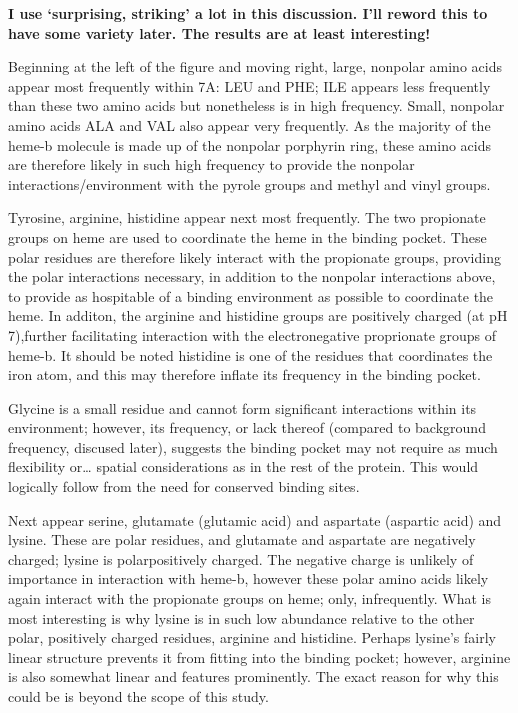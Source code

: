 \documentclass[a4paper, nobind]{templates/ociamthesis}
\begin{document}
\textbf{I use `surprising, striking' a lot in this discussion. I'll reword this to have some variety later. The results are at least interesting!}

Beginning at the left of the figure and moving right, large, nonpolar amino acids appear most frequently within 7A: LEU and PHE; ILE appears less frequently than these two amino acids but nonetheless is in high frequency. Small, nonpolar amino acids ALA and VAL also appear very frequently. As the majority of the heme-b molecule is made up of the nonpolar porphyrin ring, these amino acids are therefore likely in such high frequency to provide the nonpolar interactions/environment with the pyrole groups and methyl and vinyl groups.

Tyrosine, arginine, histidine appear next most frequently. The two propionate groups on heme are used to coordinate the heme in the binding pocket. These polar residues are therefore likely interact with the propionate groups, providing the polar interactions necessary, in addition to the nonpolar interactions above, to provide as hospitable of a binding environment as possible to coordinate the heme. In additon, the arginine and histidine groups are positively charged (at pH 7),further facilitating interaction with the electronegative proprionate groups of heme-b. It should be noted histidine is one of the residues that coordinates the iron atom, and this may therefore inflate its frequency in the binding pocket.

Glycine is a small residue and cannot form significant interactions within its environment; however, its frequency, or lack thereof (compared to background frequency, discused later), suggests the binding pocket may not require as much flexibility or\ldots{} spatial considerations as in the rest of the protein. This would logically follow from the need for conserved binding sites.

Next appear serine, glutamate (glutamic acid) and aspartate (aspartic acid) and lysine. These are polar residues, and glutamate and aspartate are negatively charged; lysine is polarpositively charged. The negative charge is unlikely of importance in interaction with heme-b, however these polar amino acids likely again interact with the propionate groups on heme; only, infrequently. What is most interesting is why lysine is in such low abundance relative to the other polar, positively charged residues, arginine and histidine. Perhaps lysine's fairly linear structure prevents it from fitting into the binding pocket; however, arginine is also somewhat linear and features prominently. The exact reason for why this could be is beyond the scope of this study.
\end{document}
